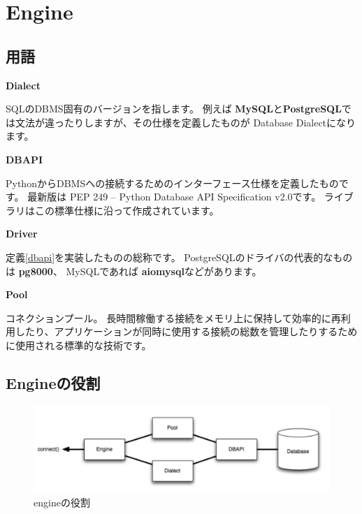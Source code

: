 \chapter{Engine}
\section{用語}

\begin{dfn}
  \textbf{Dialect}
\end{dfn}

SQLのDBMS固有のバージョンを指します。
例えば \textbf{MySQL}と\textbf{PostgreSQL}では文法が違ったりしますが、その仕様を定義したものが Database Dialectになります。

\begin{dfn}\label{dbapi}
  \textbf{DBAPI}
\end{dfn}
PythonからDBMSへの接続するためのインターフェース仕様を定義したものです。
最新版は PEP 249 -- Python Database API Specification v2.0です。
ライブラリはこの標準仕様に沿って作成されています。


\begin{dfn}
  \textbf{Driver}
\end{dfn}
定義\ref{dbapi}を実装したものの総称です。
PostgreSQLのドライバの代表的なものは \textbf{pg8000}、
MySQLであれば \textbf{aiomysql}などがあります。

\begin{dfn}
  \textbf{Pool}
\end{dfn}
コネクションプール。
長時間稼働する接続をメモリ上に保持して効率的に再利用したり、アプリケーションが同時に使用する接続の総数を管理したりするために使用される標準的な技術です。


\section {Engineの役割}
\begin{figure}[htbp]
\begin{center}
\includegraphics[width=12cm]{engine/engine.png}
\caption{engineの役割}
\end{center}
\end{figure}

